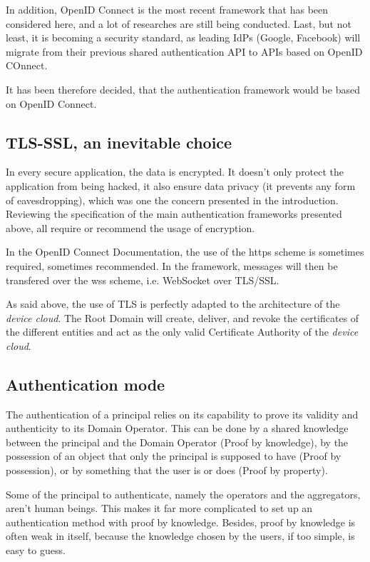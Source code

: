 In addition, OpenID Connect is the most recent framework that has been considered here, and a lot of researches are still being conducted. Last, but not least, it is becoming a security standard, as leading IdPs (Google, Facebook) will migrate from their previous shared authentication API to APIs based on OpenID COnnect.

It has been therefore decided, that the authentication framework would be based on OpenID Connect.

\subsection{TLS-SSL, an inevitable choice}
In every secure application, the data is encrypted. It doesn't only protect the application from being hacked, it also ensure data privacy (it prevents any form of eavesdropping), which was one the concern presented in the introduction. Reviewing the specification of the main authentication frameworks presented above, all require or recommend the usage of encryption.

In the OpenID Connect Documentation, the use of the https scheme is sometimes required, sometimes recommended. In the framework, messages will then be transfered over the wss scheme, i.e. WebSocket over TLS/SSL.

As said above, the use of TLS is perfectly adapted to the architecture of the \emph{device cloud}. The Root Domain will create, deliver, and revoke the certificates of the different entities and act as the only valid Certificate Authority of the \emph{device cloud}.

\subsection{Authentication mode}
\label{sec:03_auth_mode}

The authentication of a principal relies on its capability to prove its validity and authenticity to its Domain Operator. This can be done by a shared knowledge between the principal and the Domain Operator (Proof by knowledge), by the possession of an object that only the principal is supposed to have (Proof by possession), or by something that the user is or does (Proof by property).

Some of the principal to authenticate, namely the operators and the aggregators, aren't human beings. This makes it far more complicated to set up an authentication method with proof by knowledge. Besides, proof by knowledge is often weak in itself, because the knowledge chosen by the users, if too simple, is easy to guess.


